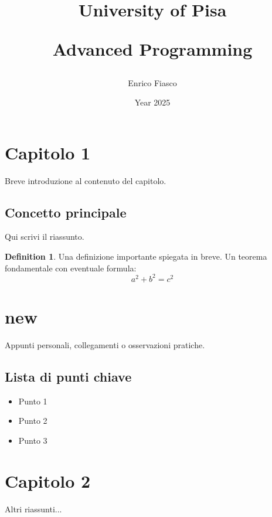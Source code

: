 \documentclass[11pt,a4paper]{article}
\title{
  {
    \Large
    \bfseries{University of Pisa}
  }

  Advanced Programming
}
\author{Enrico Fiasco}
\date{Year 2025}
\theoremstyle{definition}
\newtheorem{definition}[theorem]{Definition}
\theoremstyle{remark}
\begin{document}
\maketitle
\tableofcontents
\newpage

\section{Capitolo 1}
Breve introduzione al contenuto del capitolo.

\subsection{Concetto principale}
Qui scrivi il riassunto.

\begin{definition}
  Una definizione importante spiegata in breve.
  Un teorema fondamentale con eventuale formula:
  \[
    a^2 + b^2 = c^2
  \]
\end{definition}

\section{new}
Appunti personali, collegamenti o osservazioni pratiche.

\subsection{Lista di punti chiave}
\begin{itemize}
  \item Punto 1
  \item Punto 2
  \item Punto 3
\end{itemize}

\section{Capitolo 2}
Altri riassunti...
\end{document}
